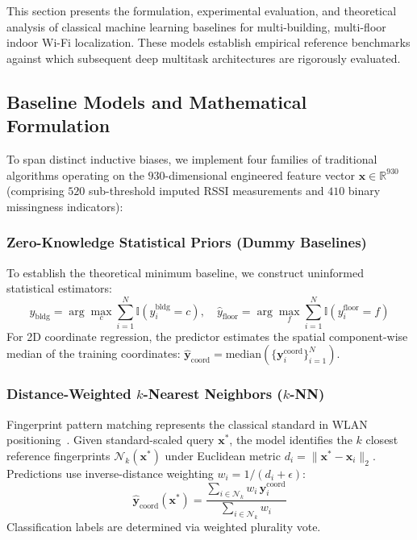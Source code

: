 
\label{sec:traditional-ml}

This section presents the formulation, experimental evaluation, and theoretical analysis of classical machine learning baselines for multi-building, multi-floor indoor Wi-Fi localization. These models establish empirical reference benchmarks against which subsequent deep multitask architectures are rigorously evaluated.

\subsection{Baseline Models and Mathematical Formulation}

To span distinct inductive biases, we implement four families of traditional algorithms operating on the $930$-dimensional engineered feature vector $\mathbf{x} \in \mathbb{R}^{930}$ (comprising $520$ sub-threshold imputed RSSI measurements and $410$ binary missingness indicators):

\subsubsection{Zero-Knowledge Statistical Priors (Dummy Baselines)}
To establish the theoretical minimum baseline, we construct uninformed statistical estimators:
\begin{equation}
\hat{y}_{\text{bldg}} = \arg\max_c \sum_{i=1}^N \mathbb{I}(y_i^{\text{bldg}} = c), \quad \hat{y}_{\text{floor}} = \arg\max_f \sum_{i=1}^N \mathbb{I}(y_i^{\text{floor}} = f)
\end{equation}
For 2D coordinate regression, the predictor estimates the spatial component-wise median of the training coordinates: $\hat{\mathbf{y}}_{\text{coord}} = \text{median}(\{\mathbf{y}_i^{\text{coord}}\}_{i=1}^N)$.

\subsubsection{Distance-Weighted $k$-Nearest Neighbors ($k$-NN)}
Fingerprint pattern matching represents the classical standard in WLAN positioning~\cite{torres2015comprehensive}. Given standard-scaled query $\mathbf{x}^*$, the model identifies the $k$ closest reference fingerprints $\mathcal{N}_k(\mathbf{x}^*)$ under Euclidean metric $d_i = \|\mathbf{x}^* - \mathbf{x}_i\|_2$. Predictions use inverse-distance weighting $w_i = 1 / (d_i + \epsilon)$:
\begin{equation}
\hat{\mathbf{y}}_{\text{coord}}(\mathbf{x}^*) = \frac{\sum_{i \in \mathcal{N}_k} w_i \, \mathbf{y}_i^{\text{coord}}}{\sum_{i \in \mathcal{N}_k} w_i}
\end{equation}
Classification labels are determined via weighted plurality vote.

